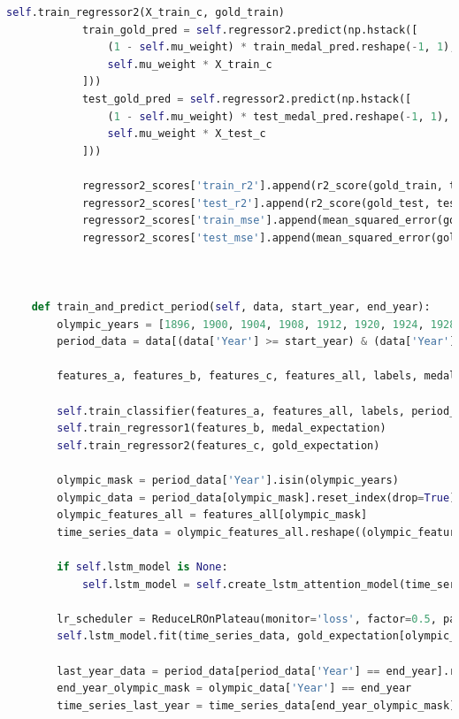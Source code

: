 \documentclass[12pt]{article}
\begin{document}
\begin{lstlisting}[language=Python, style=mystyle, caption=model.ipynb]
            self.train_regressor2(X_train_c, gold_train)
            train_gold_pred = self.regressor2.predict(np.hstack([
                (1 - self.mu_weight) * train_medal_pred.reshape(-1, 1),
                self.mu_weight * X_train_c
            ]))
            test_gold_pred = self.regressor2.predict(np.hstack([
                (1 - self.mu_weight) * test_medal_pred.reshape(-1, 1),
                self.mu_weight * X_test_c
            ]))
            
            regressor2_scores['train_r2'].append(r2_score(gold_train, train_gold_pred))
            regressor2_scores['test_r2'].append(r2_score(gold_test, test_gold_pred))
            regressor2_scores['train_mse'].append(mean_squared_error(gold_train, train_gold_pred))
            regressor2_scores['test_mse'].append(mean_squared_error(gold_test, test_gold_pred))



    def train_and_predict_period(self, data, start_year, end_year):
        olympic_years = [1896, 1900, 1904, 1908, 1912, 1920, 1924, 1928, 1932, 1936, 1948, 1952, 1956, 1960, 1964, 1968, 1972, 1976, 1980, 1984, 1988, 1992, 1996, 2000, 2004, 2008, 2012, 2016, 2020]
        period_data = data[(data['Year'] >= start_year) & (data['Year'] <= end_year)].reset_index(drop=True)

        features_a, features_b, features_c, features_all, labels, medal_expectation, gold_expectation = self.preprocess_data(period_data)

        self.train_classifier(features_a, features_all, labels, period_data)
        self.train_regressor1(features_b, medal_expectation)
        self.train_regressor2(features_c, gold_expectation)

        olympic_mask = period_data['Year'].isin(olympic_years)
        olympic_data = period_data[olympic_mask].reset_index(drop=True)
        olympic_features_all = features_all[olympic_mask]
        time_series_data = olympic_features_all.reshape((olympic_features_all.shape[0], 1, olympic_features_all.shape[1]))

        if self.lstm_model is None:
            self.lstm_model = self.create_lstm_attention_model(time_series_data.shape)

        lr_scheduler = ReduceLROnPlateau(monitor='loss', factor=0.5, patience=3, min_lr=1e-6, verbose=1)
        self.lstm_model.fit(time_series_data, gold_expectation[olympic_mask], epochs=10, batch_size=32, verbose=1, callbacks=[lr_scheduler])

        last_year_data = period_data[period_data['Year'] == end_year].reset_index(drop=True)
        end_year_olympic_mask = olympic_data['Year'] == end_year
        time_series_last_year = time_series_data[end_year_olympic_mask]


\end{lstlisting}
\end{document}

